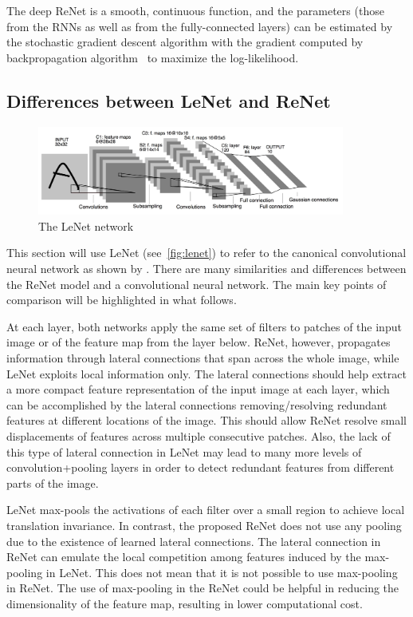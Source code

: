 The deep ReNet is a smooth, continuous function, and the parameters (those from
the RNNs as well as from the fully-connected layers) can be estimated by the
stochastic gradient descent algorithm with the gradient computed by
backpropagation algorithm~\citep[see, e.g.,][]{BP86} to maximize the
log-likelihood.

\subsection{Differences between LeNet and ReNet}
\label{sec:lenetrenet}

\begin{figure}[h]
    \centering
    \includegraphics[width=0.9\textwidth]{img/lenet5.jpg}
    \caption{The LeNet network}
    \label{fig:lenet}
    \vspace{-3mm}
\end{figure}

This section will use LeNet (see~\autoref{fig:lenet}) to refer to the canonical
convolutional neural network as shown by \citet{LeCun89}. There are many
similarities and differences between the ReNet model and a convolutional neural
network. The main key points of comparison will be highlighted in what follows.

At each layer, both networks apply the same set of filters to patches of the
input image or of the feature map from the layer below. ReNet, however,
propagates information through lateral connections that span across the whole
image, while LeNet exploits local information only. The lateral connections
should help extract a more compact feature representation of the input image at
each layer, which can be accomplished by the lateral connections
removing/resolving redundant features at different locations of the image. This
should allow ReNet resolve small displacements of features across multiple
consecutive patches. Also, the lack of this type of lateral connection in LeNet
may lead to many more levels of convolution+pooling layers in order to detect
redundant features from different parts of the image.

LeNet max-pools the activations of each filter over a small region to achieve
local translation invariance. In contrast, the proposed ReNet does not use any
pooling due to the existence of learned lateral connections. The lateral
connection in ReNet can emulate the local competition among features induced by
the max-pooling in LeNet.  This does not mean that it is not possible to use
max-pooling in ReNet. The use of max-pooling in the ReNet could be helpful in
reducing the dimensionality of the feature map, resulting in lower computational
cost.

